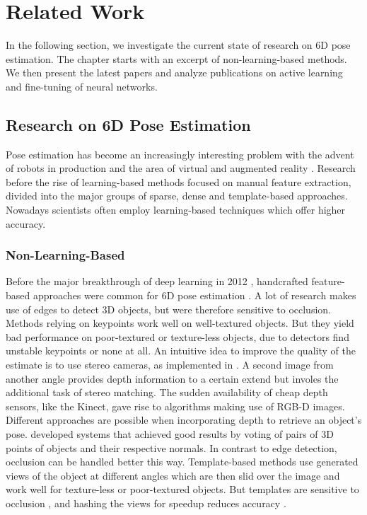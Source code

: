 \chapter{Related Work}

In the following section, we investigate the current state of research on 6D pose estimation. The chapter starts with an excerpt of non-learning-based methods. We then present the latest papers and analyze publications on active learning and fine-tuning of neural networks.

\section{Research on 6D Pose Estimation}

Pose estimation has become an increasingly interesting problem with the advent of robots in production and the area of virtual and augmented reality \cite{bb8}. Research before the rise of learning-based methods focused on manual feature extraction, divided into the major groups of sparse, dense and template-based approaches. Nowadays scientists often employ learning-based techniques which offer higher accuracy.

\subsection{Non-Learning-Based}

Before the major breakthrough of deep learning in 2012 \cite{alexnet}, handcrafted feature-based approaches were common for 6D pose estimation \cite{ylecun}. A lot of research \cite{gklein,dglowe2,charris} makes use of edges to detect 3D objects, but were therefore sensitive to occlusion. Methods relying on keypoints \cite{dglowe1, dwagner} work well on well-textured objects. But they yield bad performance on poor-textured or texture-less objects, due to detectors find unstable keypoints or none at all. 
\nnewline
An intuitive idea to improve the quality of the estimate is to use stereo cameras, as implemented in \cite{kpauwels}. A second image from another angle provides depth information to a certain extend but involes the additional task of stereo matching. The sudden availability of cheap depth sensors, like the Kinect, gave rise to algorithms making use of RGB-D images. Different approaches are possible when incorporating depth to retrieve an object's pose. \cite{bdrost, salasmoreno} developed systems that achieved good results by voting of pairs of 3D points of objects and their respective normals. In contrast to edge detection, occlusion can be handled better this way. 
\nnewline
Template-based methods \cite{hinterstoisser1, hinterstoisser2, rioscabrera, csteger} use generated views of the object at different angles which are then slid over the image and work well for texture-less or poor-textured objects. But templates are sensitive to occlusion \cite{bb8}, and hashing the views for speedup reduces accuracy \cite{zhou}.

